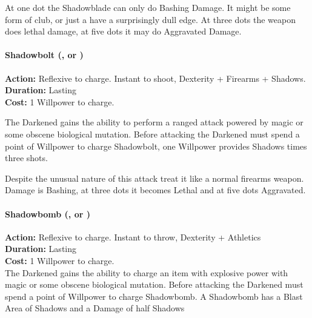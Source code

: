 At one dot the Shadowblade can only do Bashing Damage. It might be some form of club, or just a have a surprisingly dull edge. At three dots the weapon does lethal damage, at five dots it may do Aggravated Damage.\\

\paragraph*{Shadowbolt (\textbullet, \textbullet\textbullet\textbullet or \textbullet\textbullet\textbullet\textbullet\textbullet)} 

\noindent \textbf{Action:} Reflexive to charge. Instant to shoot, Dexterity + Firearms + Shadows.\\

\noindent \textbf{Duration:} Lasting \\

\noindent \textbf{Cost:} 1 Willpower to charge.

The Darkened gains the ability to perform a ranged attack powered by magic or some obscene biological mutation. Before attacking the Darkened must spend a point of Willpower to charge Shadowbolt, one Willpower provides Shadows times three shots.

Despite the unusual nature of this attack treat it like a normal firearms weapon. Damage is Bashing, at three dots it becomes Lethal and at five dots Aggravated.\\

\paragraph*{Shadowbomb (\textbullet, \textbullet\textbullet\textbullet or \textbullet\textbullet\textbullet\textbullet\textbullet)}

\noindent \textbf{Action:} Reflexive to charge. Instant to throw, Dexterity + Athletics\\

\noindent \textbf{Duration:} Lasting \\

\noindent \textbf{Cost:} 1 Willpower to charge.\\

\noindent The Darkened gains the ability to charge an item with explosive power with magic or some obscene biological mutation. Before attacking the Darkened must spend a point of Willpower to charge Shadowbomb. A Shadowbomb has a Blast Area of Shadows and a Damage of half Shadows

